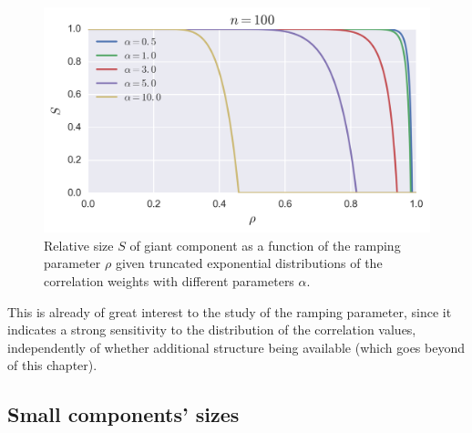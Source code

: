 \begin{figure}[tb]
	\centering
	\includegraphics[scale=.8]{figures/3_exponential_giant_component.png}
	\caption{Relative size $S$ of giant component as a function of the ramping parameter $\rho$ given truncated exponential distributions  of the correlation weights with different parameters $\alpha$.}
	\label{fig:exponential_giant_component}
\end{figure}
This is already of great interest to the study of the ramping parameter, since it indicates a strong sensitivity to the distribution of the correlation values, independently of whether additional structure being available (which goes beyond of this chapter).





\subsection{Small components' sizes} %
\label{sub:small_component_sizes}

